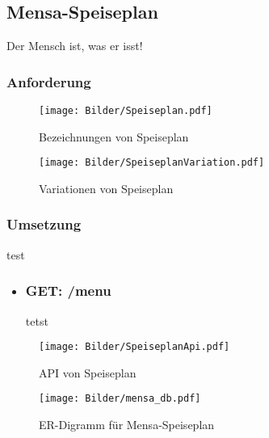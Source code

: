 \subsection{Mensa-Speiseplan}
\label{sec:mensa}

Der Mensch ist, was er isst!

\subsubsection{Anforderung}
\label{sec:mensa_anforderung}

\begin{figure}[H]
\centering
\texttt{[image: Bilder/Speiseplan.pdf]}
\caption{Bezeichnungen von Speiseplan\label{fig:analysemensa}}
\end{figure}

\begin{figure}[H]
\centering
\texttt{[image: Bilder/SpeiseplanVariation.pdf]}
\caption{Variationen von Speiseplan\label{fig:variationmensa}}
\end{figure}

\subsubsection{Umsetzung}
\label{sec:mensa_umsetzung}
test
\begin{itemize}
\item \subsubsection*{GET: /menu} tetst
\end{itemize}

\begin{figure}[H]
\centering
\texttt{[image: Bilder/SpeiseplanApi.pdf]}
\caption{API von Speiseplan\label{fig:apimensa}}
\end{figure}

\begin{figure}[H]
\centering
\texttt{[image: Bilder/mensa\_db.pdf]}
\caption{ER-Digramm für Mensa-Speiseplan\label{fig:ermensa}}
\end{figure}